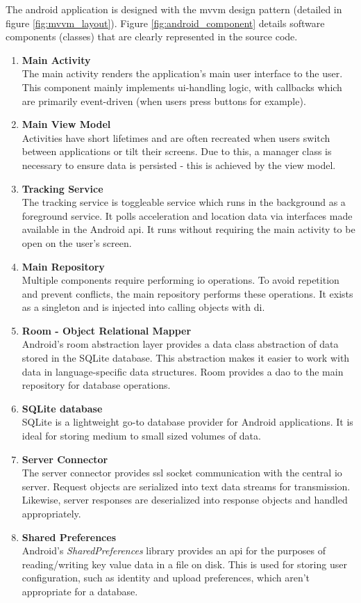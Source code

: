 The android application is designed with the \ac{mvvm} design pattern (detailed in figure \ref{fig:mvvm_layout}).
Figure \ref{fig:android_component} details software components (classes) that are clearly represented in the source code.
\begin{enumerate}
\item \textbf{Main Activity}\\
The main activity renders the application's main user interface to the user.
This component mainly implements \Ac{ui}-handling logic, with callbacks which are primarily event-driven (when users press buttons for example).
\item \textbf{Main View Model}\\
Activities have short lifetimes and are often recreated when users switch between applications or tilt their screens.
Due to this, a manager class is necessary to ensure data is persisted - this is achieved by the view model.
\item \textbf{Tracking Service}\\
The tracking service is toggleable service which runs in the background as a foreground service.
It polls acceleration and location data via interfaces made available in the Android \ac{api}.
It runs without requiring the main activity to be open on the user's screen.
\item \textbf{Main Repository}\\
Multiple components require performing \ac{io} operations.
To avoid repetition and prevent conflicts, the main repository performs these operations.
It exists as a singleton and is injected into calling objects with \ac{di}.
\item \textbf{Room - Object Relational Mapper}\\
Android's room abstraction layer provides a data class abstraction of data stored in the SQLite database.
This abstraction makes it easier to work with data in language-specific data structures.
Room provides a \ac{dao} to the main repository for database operations.
\item \textbf{SQLite database}\\
SQLite is a lightweight go-to database provider for Android applications.
It is ideal for storing medium to small sized volumes of data.
\item \textbf{Server Connector}\\
The server connector provides \ac{ssl} socket communication with the central \ac{io} server.
Request objects are serialized into text data streams for transmission.
Likewise, server responses are deserialized into response objects and handled appropriately.
\item \textbf{Shared Preferences}\\
Android's \textit{SharedPreferences} library provides an \ac{api} for the purposes of reading/writing key value data in a file on disk.
This is used for storing user configuration, such as identity and upload preferences, which aren't appropriate for a database.
\end{enumerate}

